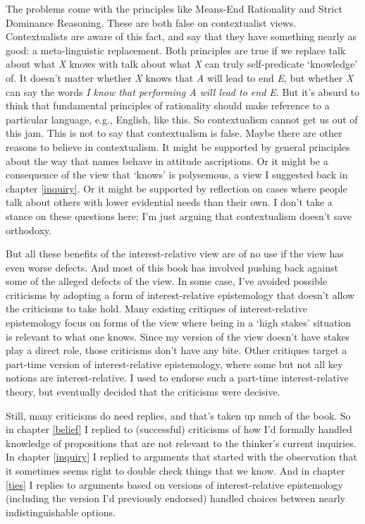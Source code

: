 \documentclass[
  11pt,
]{book}
\begin{document}
The problems come with the principles like Means-End Rationality and Strict Dominance Reasoning. These are both false on contextualist views. Contextualists are aware of this fact, and say that they have something nearly as good: a meta-linguistic replacement. Both principles are true if we replace talk about what \emph{X} knows with talk about what \emph{X} can truly self-predicate `knowledge' of. It doesn't matter whether \emph{X} knows that \emph{A} will lead to end \emph{E}, but whether \emph{X} can say the words \emph{I know that performing A will lead to end E}. But it's absurd to think that fundamental principles of rationality should make reference to a particular language, e.g., English, like this. So contextualism cannot get us out of this jam. This is not to say that contextualism is false. Maybe there are other reasons to believe in contextualism. It might be supported by general principles about the way that names behave in attitude ascriptions. Or it might be a consequence of the view that `knows' is polysemous, a view I suggested back in chapter \ref{inquiry}. Or it might be supported by reflection on cases where people talk about others with lower evidential needs than their own. I don't take a stance on these questions here; I'm just arguing that contextualism doesn't save orthodoxy.

But all these benefits of the interest-relative view are of no use if the view has even worse defects. And most of this book has involved pushing back against some of the alleged defects of the view. In some case, I've avoided possible criticisms by adopting a form of interest-relative epistemology that doesn't allow the criticisms to take hold. Many existing critiques of interest-relative epistemology focus on forms of the view where being in a `high stakes' situation is relevant to what one knows. Since my version of the view doesn't have stakes play a direct role, those criticisms don't have any bite. Other critiques target a part-time version of interest-relative epistemology, where some but not all key notions are interest-relative. I used to endorse such a part-time interest-relative theory, but eventually decided that the criticisms were decisive.

Still, many criticisms do need replies, and that's taken up much of the book. So in chapter \ref{belief} I replied to (successful) criticisms of how I'd formally handled knowledge of propositions that are not relevant to the thinker's current inquiries. In chapter \ref{inquiry} I replied to arguments that started with the observation that it sometimes seems right to double check things that we know. And in chapter \ref{ties} I replies to arguments based on versions of interest-relative epistemology (including the version I'd previously endorsed) handled choices between nearly indistinguishable options.
\end{document}
